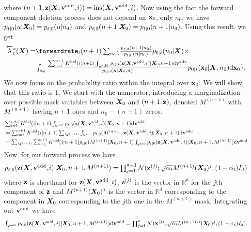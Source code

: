 where $(n+1, \mathbf{z}({\bm{X}}, {\mathbf{v}}^{\textup{add}}, i)) = \text{ins}({\bm{X}}, {\mathbf{v}}^{\textup{add}}, i)$. Now using the fact
the forward component deletion process does not depend on ${\mathbf{x}}_0$, only $n_0$, we
have $p_{t|0}(n | {\bm{X}}_0) = p_{t|0}(n | n_0)$ and
$p_{t|0}(n+1 | {\bm{X}}_0) = p_{t|0}(n+1 | n_0)$. Using this result, we get 
\begin{align}
   \backwardrate_t^*(\mX) = &\textstyle \forwardrate_t(n+1) \sum_{n_0} \{ \frac{p_{t|0}(n+1 | n_0)}{p_{t|0}(n | n_0)} p_{0|t}(n_0 | \mX) \times \\
\label{eq:backwardrateparamProofLine1}
   &\textstyle   \int_{\rvx_0}  \frac{\sum_{i=1}^{n+1} K^{\text{del}}(i | n+1) \int_{\yadd} p_{t|0}(\z(\mX, \yadd, i) | \mX_0, n+1) \rmd \yadd}{p_{t|0}(\rvx | \mX_0, n)} p_{0|t}(\rvx_0 | \mX, n_0)\rmd \rvx_0 \} . 
\end{align}
We now focus on the probability ratio within the integral over ${\mathbf{x}}_0$. We will show that this ratio is $1$. We start with the numerator, introducing a marginalization over possible mask variables between ${\bm{X}}_0$ and $(n+1, \mathbf{z})$, denoted $M^{(n+1)}$ with $M^{(n+1)}$ having $n+1$ ones and $n_0 - (n+1)$ zeros.
\begin{align}
    &\textstyle \sum_{i=1}^{n+1} K^{\text{del}}(i | n+1) \int_{{\mathbf{v}}^{\textup{add}}} p_{t|0}(\mathbf{z}({\bm{X}}, {\mathbf{v}}^{\textup{add}}, i) | {\bm{X}}_0, n+1) \mathrm{d} {\mathbf{v}}^{\textup{add}} \\
    &\textstyle  = \sum_{i=1}^{n+1} K^{\text{del}}(i | n+1) \sum_{M^{(n+1)}} \int_{{\mathbf{v}}^{\textup{add}}} p_{t|0}(M^{(n+1)}, \mathbf{z}({\bm{X}}, {\mathbf{v}}^{\textup{add}}, i) | {\bm{X}}_0, n+1) \mathrm{d} {\mathbf{v}}^{\textup{add}} \\
    &\textstyle  = \sum_{M^{(n+1)}} \sum_{i=1}^{n+1} K^{\text{del}}(i | n+1)  p_{t|0}(M^{(n+1)} | {\bm{X}}_0, n+1)  \int_{{\mathbf{v}}^{\textup{add}}} p_{t|0}(\mathbf{z}({\bm{X}}, {\mathbf{v}}^{\textup{add}}, i) | {\bm{X}}_0, n+1, M^{(n+1)}) \mathrm{d} {\mathbf{v}}^{\textup{add}} 
\end{align}
Now, for our forward process we have
\begin{equation}
\textstyle    p_{t|0}(\mathbf{z} ({\bm{X}}, {\mathbf{v}}^{\textup{add}}, i) | {\bm{X}}_0, n+1, M^{(n+1)}) = \prod_{j=1}^{n+1} \mathcal{N}( \mathbf{z}^{(j)} ; \sqrt{\alpha_t} M^{(n+1)}({\bm{X}}_0)^j, (1-\alpha_t) I_d)
\end{equation}
where $\mathbf{z}$ is shorthand for $\mathbf{z}({\bm{X}}, {\mathbf{v}}^{\textup{add}}, i)$, $\mathbf{z}^{(j)}$ is the vector in $\mathbb{R}^d$ for the $j$th component of $\mathbf{z}$ and $M^{(n+1)}({\bm{X}}_0)^j$ is the vector in $\mathbb{R}^d$ corresponding to the component in ${\bm{X}}_0$ corresponding to the $j$th one in the $M^{(n+1)}$ mask. Integrating out ${\mathbf{v}}^{\textup{add}}$ we have
\begin{equation}
\textstyle    \int_{{\mathbf{v}}^{\textup{add}}} p_{t|0}(\mathbf{z}({\bm{X}}, {\mathbf{v}}^{\textup{add}}, i) | {\bm{X}}_0, n+1, M^{(n+1)}) \mathrm{d} {\mathbf{v}}^{\textup{add}}  = \prod_{j=1}^{n}\mathcal{N}( {\mathbf{x}}^{(j)} ; \sqrt{\alpha_t} M^{(n+1) \backslash i}({\bm{X}}_0)^j, (1-\alpha_t) I_d) ,
\end{equation}
